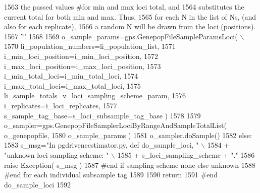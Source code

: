\begin{DoxyCode}
1563 \textcolor{stringliteral}{            the passed values #for min and max loci total, and }
1564 \textcolor{stringliteral}{            substitutes the current total for both min and max. Thus,}
1565 \textcolor{stringliteral}{            for each N in the list of Ns, (and also for each replicate),  }
1566 \textcolor{stringliteral}{            a random N will be drawn from the loci (positions). }
1567 \textcolor{stringliteral}{            '''}
1568 
1569             o\_sample\_params=gps.GenepopFileSampleParamsLoci( \(\backslash\)
1570                                         li\_population\_numbers=li\_population\_list,
1571                                         i\_min\_loci\_position=i\_min\_loci\_position,
1572                                         i\_max\_loci\_position=i\_max\_loci\_position,
1573                                         i\_min\_total\_loci=i\_min\_total\_loci,
1574                                         i\_max\_total\_loci=i\_max\_total\_loci,
1575                                         li\_sample\_totals=v\_loci\_sampling\_scheme\_param,
1576                                         i\_replicates=i\_loci\_replicates,
1577                                         s\_sample\_tag\_base=s\_loci\_subsample\_tag\_base )
1578 
1579             o\_sampler=gps.GenepopFileSamplerLociByRangeAndSampleTotalList( o\_genepopfile,
1580                                                                             o\_sample\_params )
1581             o\_sampler.doSample()
1582         \textcolor{keywordflow}{else}:
1583             s\_msg=\textcolor{stringliteral}{"In pgdriveneestimator.py, def do\_sample\_loci, "} \(\backslash\)
1584                         + \textcolor{stringliteral}{"unknown loci sampling scheme: "} \(\backslash\)
1585                         + s\_loci\_sampling\_scheme + \textcolor{stringliteral}{"."}
1586             \textcolor{keywordflow}{raise} Exception( s\_msg )
1587         \textcolor{comment}{#end if sampling scheme none else unknown}
1588     \textcolor{comment}{#end for each individual subsample tag}
1589 
1590     \textcolor{keywordflow}{return}
1591 \textcolor{comment}{#end do\_sample\_loci}
1592 
\end{DoxyCode}
